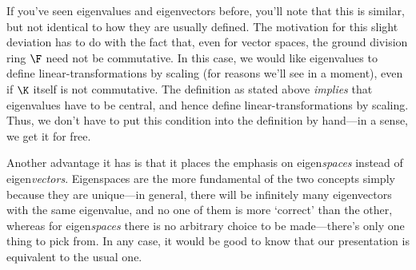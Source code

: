If you've seen eigenvalues and eigenvectors before, you'll note that this is similar, but not identical to how they are usually defined.  The motivation for this slight deviation has to do with the fact that, even for vector spaces, the ground division ring $\F$ need not be commutative.  In this case, we would like eigenvalues to define linear-transformations by scaling (for reasons we'll see in a moment), even if $\K$ itself is not commutative.  The definition as stated above \emph{implies} that eigenvalues have to be central, and hence define linear-transformations by scaling.  Thus, we don't have to put this condition into the definition by hand---in a sense, we get it for free.

Another advantage it has is that it places the emphasis on eigen\emph{spaces} instead of eigen\emph{vectors}.  Eigenspaces are the more fundamental of the two concepts simply because they are unique---in general, there will be infinitely many eigenvectors with the same eigenvalue, and no one of them is more `correct' than the other, whereas for eigen\emph{spaces} there is no arbitrary choice to be made---there's only one thing to pick from.  In any case, it would be good to know that our presentation is equivalent to the usual one.
